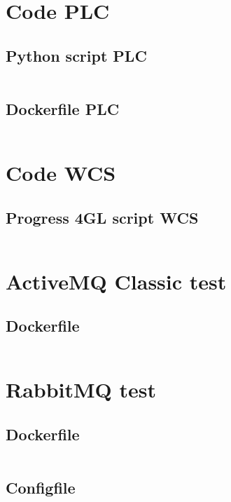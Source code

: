 
\section{Code PLC}\label{sec:code_plc}

\subsection{Python script PLC} \label{sec:script_plc}
\inputminted{python3}{../tests/plc/plc-simulator.py}\label{listing:script_plc}

\subsection{Dockerfile PLC} \label{sec:dockerplc}
\inputminted{python3}{../tests/plc/Dockerfile} \label{listing:docker_plc}


\section{Code WCS}\label{sec:code_wcs}

\subsection{Progress 4GL script WCS} \label{sec:script_wcs}
\inputminted{python3}{../tests/wcs/wcs.p} \label{listing:script_wcs}


\section{ActiveMQ Classic test}\label{sec:code_amq}
\subsection{Dockerfile}\label{sec:docker_amq}
\inputminted{python3}{../tests/messaging/activemq-server/Dockerfile}\label{listing:docker_amq}
 

\section{RabbitMQ test}\label{sec:code_rabbitmq}
\subsection{Dockerfile}\label{sec:docker_rabbitmq}
\inputminted{python3}{../tests/messaging/rabbitmq-server/Dockerfile}\label{listing:docker_rabbitmq}

\subsection{Configfile}\label{sec:config_rabbitmq}
\inputminted{python3}{../tests/messaging/rabbitmq-server/rabbitmq.conf}\label{listing:config_rabbitmq}